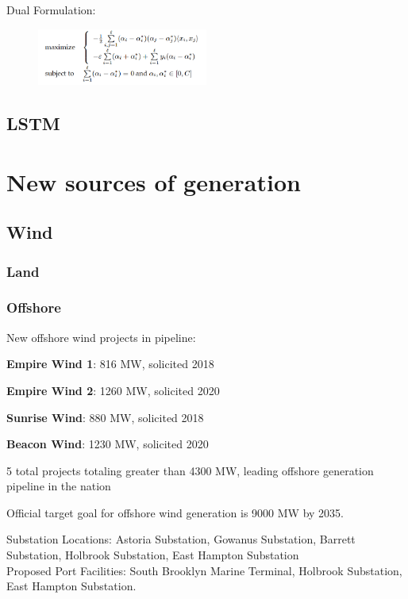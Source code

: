 \documentclass[plain]{article}
\newcommand{\1}{\mathbbm{1}}
\begin{document}
Dual Formulation:
\begin{figure}[H]
	\centering
	\includegraphics[width=0.5\textwidth]{svm_dual.PNG}
	\caption{}
	\label{fig:}

\end{figure}
\subsection{LSTM}
\section{New sources of generation}
\subsection{Wind}

\subsubsection{Land}

\subsubsection{Offshore}
New offshore wind projects in pipeline:
\begin{tightlist}
	\item \textbf{Empire Wind 1}: 816 MW, solicited 2018 \cite{noauthor_new_nodate-1}
	\item \textbf{Empire Wind 2}: 1260 MW, solicited 2020 \cite{noauthor_new_nodate-1}
	\item \textbf{Sunrise Wind}: 880 MW, solicited 2018 \cite{noauthor_new_nodate-1}
	\item \textbf{Beacon Wind}: 1230 MW, solicited 2020 \cite{noauthor_new_nodate-1}
\end{tightlist}

5 total projects totaling greater than 4300 MW, leading offshore generation pipeline in the nation

Official target goal for offshore wind generation is 9000 MW by 2035. \cite{noauthor_us_nodate-1}

Substation Locations: Astoria Substation, Gowanus Substation, Barrett Substation, Holbrook Substation, East Hampton Substation\\
Proposed Port Facilities: South Brooklyn Marine Terminal, Holbrook Substation, East Hampton Substation. \cite{noauthor_new_nodate-1}
\end{document}
